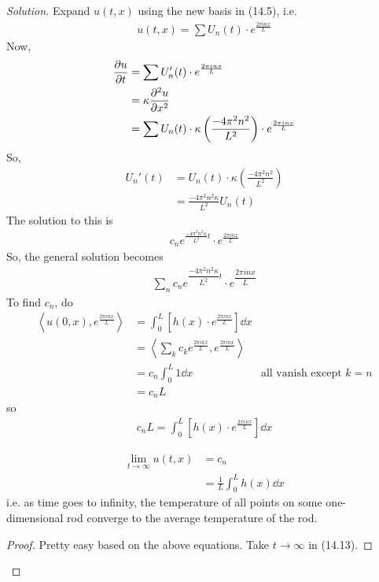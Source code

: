 \begin{proof}[Solution]
    Expand $u(t, x)$ using the new basis in (14.5), i.e.
    \begin{align}
        u(t, x) = \sum U_n(t) \cdot e^{\frac{2\pi in x}{L}}
    \end{align}
    Now,
    \begin{align}
        \pdv{u}{t} &= \sum U_n'(t) \cdot e^{\frac{2\pi in x}{L}}\\
        &= \kappa \pdv[2]{u}{x}\\
        &= \sum U_n(t) \cdot \kappa\left( \frac{-4\pi^2 n^2}{L^2} \right) \cdot e^{\frac{2\pi in x}{L}}
    \end{align}
    So,
    \begin{align}
        U_n'(t) &= U_n(t) \cdot \kappa\left( \frac{-4\pi^2 n^2}{L^2} \right)\\
        &= \frac{-4\pi^2 n^2 \kappa}{L^2} U_n(t)
    \end{align}
    The solution to this is
    \begin{align}
        c_n e^{\frac{-4\pi^2n^2\kappa}{L^2}t} \cdot e^{\frac{2\pi in x}{L}}
    \end{align}
    So, the general solution becomes
    \begin{align}
        \boxed{\sum_n c_n e^{\dfrac{-4\pi^2n^2\kappa}{L^2}t} \cdot e^{\dfrac{2\pi in x}{L}}}
    \end{align}
    To find $c_n$, do
    \begin{align}
        \left\langle u(0, x), e^{\frac{2\pi in x}{L}} \right\rangle &= \int_0^L \left[ h(x) \cdot e^{\frac{2\pi in x}{L}} \right] \dd{x}\\
        &= \left\langle \sum_k c_k e^{\frac{2\pi ik x}{L}}, e^{\frac{2\pi in x}{L}} \right\rangle\\
        &= c_n \int_0^L 1 \dd{x} & \text{all vanish except $k = n$}\\
        &= c_nL
    \end{align}
    so
    \begin{align}
        \boxed{c_nL = \int_0^L \left[ h(x) \cdot e^{\frac{2\pi in x}{L}} \right] \dd{x}}
    \end{align}
    \begin{lemma}
        \begin{align}
            \lim_{t \to \infty} u(t, x) &= c_n\\
            &= \frac{1}{L} \int_0^L h(x) \dd{x}
        \end{align}
        i.e. as time goes to infinity, the temperature of all points on some one-dimensional rod converge to the average temperature of the rod.
        \begin{proof}
            Pretty easy based on the above equations. Take $t \to \infty$ in (14.13).
        \end{proof}
    \end{lemma}
\end{proof}

